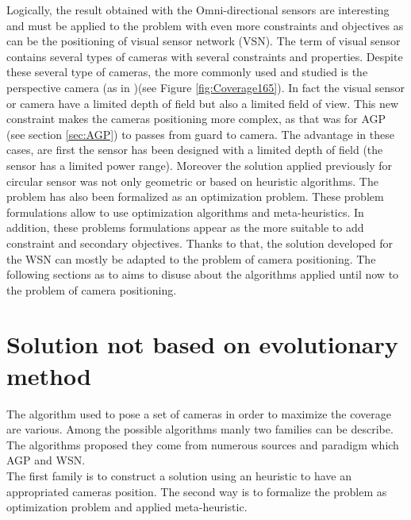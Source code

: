 Logically, the result obtained with the Omni-directional sensors are interesting and must be applied to the problem with even more constraints and objectives as can be the positioning of visual sensor network (VSN). The term of  visual sensor contains several types of cameras with several constraints and properties. Despite these several type of cameras, the more commonly used and studied is the perspective camera (as in \citep{149*mavrinac2013,174*zhang2016,193*fu2014,42*bulusu2001,165*jiang2010})(see Figure \ref{fig:Coverage165}). 
  In fact the visual sensor or camera have a limited depth of field but also a limited field of view. This new constraint makes the cameras positioning more complex, as that was for AGP (see section \ref{sec:AGP}) to passes from guard to camera.
 The advantage in these cases, are first the sensor has been designed with a limited depth of field (the sensor has a limited power range). 
 Moreover the solution applied previously for circular sensor was not only geometric or based on heuristic algorithms. The problem has also been formalized as an optimization problem. These problem formulations allow to use optimization algorithms and meta-heuristics. In addition, these problems formulations appear as the more suitable to add constraint and secondary objectives. Thanks to that, the solution  developed for the WSN can mostly be adapted to the problem of camera positioning. 
 The following sections as to aims to disuse about the algorithms applied until now to the problem of camera positioning.
  

	\section{Solution not based on evolutionary method}\label{sec:NonEAmethod}
	
The algorithm used to pose a set of cameras in order to maximize the coverage are various.  Among the possible algorithms manly two families can be describe. The algorithms proposed they come from numerous sources and paradigm  which AGP and WSN.\\
 The first family is to construct a solution using an heuristic to have an appropriated cameras position. The second way is to formalize the problem as optimization problem and applied meta-heuristic. 

